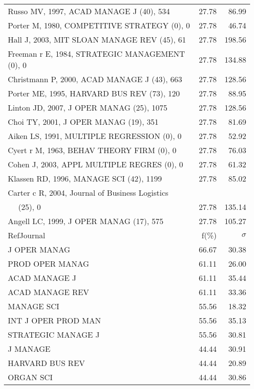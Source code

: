 \documentclass[a4paper,11pt]{report}
\begin{document}
\begin{landscape}
\begin{table}[!ht]
{\begin{tabular}{|l r r|}
Russo MV, 1997, ACAD MANAGE J (40), 534 & 27.78 & 86.99\\
Porter M, 1980, COMPETITIVE STRATEGY (0), 0 & 27.78 & 46.74\\
Hall J, 2003, MIT SLOAN MANAGE REV (45), 61 & 27.78 & 198.56\\
Freeman r E, 1984, STRATEGIC MANAGEMENT (0), 0 & 27.78 & 134.88\\
Christmann P, 2000, ACAD MANAGE J (43), 663 & 27.78 & 128.56\\
Porter ME, 1995, HARVARD BUS REV (73), 120 & 27.78 & 88.95\\
Linton JD, 2007, J OPER MANAG (25), 1075 & 27.78 & 128.56\\
Choi TY, 2001, J OPER MANAG (19), 351 & 27.78 & 81.69\\
Aiken LS, 1991, MULTIPLE REGRESSION (0), 0 & 27.78 & 52.92\\
Cyert r M, 1963, BEHAV THEORY FIRM (0), 0 & 27.78 & 76.03\\
Cohen J, 2003, APPL MULTIPLE REGRES (0), 0 & 27.78 & 61.32\\
Klassen RD, 1996, MANAGE SCI (42), 1199 & 27.78 & 85.02\\
Carter c R, 2004, Journal of Business Logistics &  & \\
$\quad$ (25), 0 & 27.78 & 135.14\\
Angell LC, 1999, J OPER MANAG (17), 575 & 27.78 & 105.27\\
\hline
\hline
RefJournal & f(\%) & $\sigma$\\
\hline
J OPER MANAG & 66.67 & 30.38\\
PROD OPER MANAG & 61.11 & 26.00\\
ACAD MANAGE J & 61.11 & 35.44\\
ACAD MANAGE REV & 61.11 & 33.36\\
MANAGE SCI & 55.56 & 18.32\\
INT J OPER PROD MAN & 55.56 & 35.13\\
STRATEGIC MANAGE J & 55.56 & 30.81\\
J MANAGE & 44.44 & 30.91\\
HARVARD BUS REV & 44.44 & 20.89\\
ORGAN SCI & 44.44 & 30.86\\
\hline
\end{tabular}
}
\end{table}

\clearpage


\end{landscape}
\end{document}

